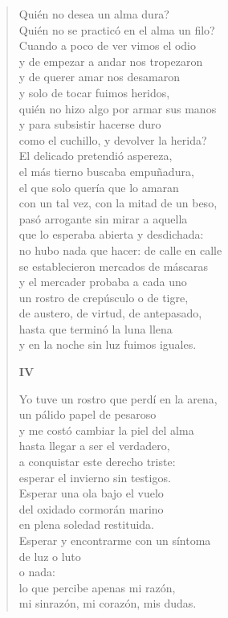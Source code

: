 \documentclass[12pt]{article}
\begin{document}
\begin{verse}
Quién no desea un alma dura?\\
Quién no se practicó en el alma un filo?\\
Cuando a poco de ver vimos el odio\\
y de empezar a andar nos tropezaron\\
y de querer amar nos desamaron\\
y solo de tocar fuimos heridos,\\
quién no hizo algo por armar sus manos\\
y para subsistir hacerse duro\\
como el cuchillo, y devolver la herida?\\
El delicado pretendió aspereza,\\
el más tierno buscaba empuñadura,\\
el que solo quería que lo amaran\\
con un tal vez, con la mitad de un beso,\\
pasó arrogante sin mirar a aquella\\
que lo esperaba abierta y desdichada:\\
no hubo nada que hacer: de calle en calle\\
se establecieron mercados de máscaras\\
y el mercader probaba a cada uno\\
un rostro de crepúsculo o de tigre,\\
de austero, de virtud, de antepasado,\\
hasta que terminó la luna llena\\
y en la noche sin luz fuimos iguales.  

{\bfseries\scshape {IV}}

Yo tuve un rostro que perdí en la arena,\\
un pálido papel de pesaroso\\
y me costó cambiar la piel del alma\\
hasta llegar a ser el verdadero,\\
a conquistar este derecho triste:\\
esperar el invierno sin testigos.\\
Esperar una ola bajo el vuelo\\
del oxidado cormorán marino\\
en plena soledad restituida.\\
Esperar y encontrarme con un síntoma\\
de luz o luto\\
o nada:\\
lo que percibe apenas mi razón,\\
mi sinrazón, mi corazón, mis dudas.  


\end{verse}
\end{document}
